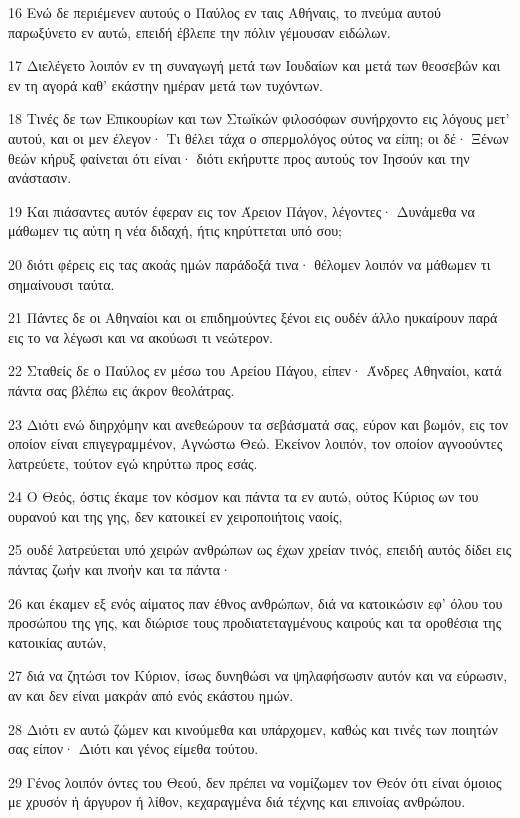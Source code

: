 \par 16 Ενώ δε περιέμενεν αυτούς ο Παύλος εν ταις Αθήναις, το πνεύμα αυτού παρωξύνετο εν αυτώ, επειδή έβλεπε την πόλιν γέμουσαν ειδώλων.
\par 17 Διελέγετο λοιπόν εν τη συναγωγή μετά των Ιουδαίων και μετά των θεοσεβών και εν τη αγορά καθ' εκάστην ημέραν μετά των τυχόντων.
\par 18 Τινές δε των Επικουρίων και των Στωϊκών φιλοσόφων συνήρχοντο εις λόγους μετ' αυτού, και οι μεν έλεγον· Τι θέλει τάχα ο σπερμολόγος ούτος να είπη; οι δέ· Ξένων θεών κήρυξ φαίνεται ότι είναι· διότι εκήρυττε προς αυτούς τον Ιησούν και την ανάστασιν.
\par 19 Και πιάσαντες αυτόν έφεραν εις τον Άρειον Πάγον, λέγοντες· Δυνάμεθα να μάθωμεν τις αύτη η νέα διδαχή, ήτις κηρύττεται υπό σου;
\par 20 διότι φέρεις εις τας ακοάς ημών παράδοξά τινα· θέλομεν λοιπόν να μάθωμεν τι σημαίνουσι ταύτα.
\par 21 Πάντες δε οι Αθηναίοι και οι επιδημούντες ξένοι εις ουδέν άλλο ηυκαίρουν παρά εις το να λέγωσι και να ακούωσι τι νεώτερον.
\par 22 Σταθείς δε ο Παύλος εν μέσω του Αρείου Πάγου, είπεν· Άνδρες Αθηναίοι, κατά πάντα σας βλέπω εις άκρον θεολάτρας.
\par 23 Διότι ενώ διηρχόμην και ανεθεώρουν τα σεβάσματά σας, εύρον και βωμόν, εις τον οποίον είναι επιγεγραμμένον, Αγνώστω Θεώ. Εκείνον λοιπόν, τον οποίον αγνοούντες λατρεύετε, τούτον εγώ κηρύττω προς εσάς.
\par 24 Ο Θεός, όστις έκαμε τον κόσμον και πάντα τα εν αυτώ, ούτος Κύριος ων του ουρανού και της γης, δεν κατοικεί εν χειροποιήτοις ναοίς,
\par 25 ουδέ λατρεύεται υπό χειρών ανθρώπων ως έχων χρείαν τινός, επειδή αυτός δίδει εις πάντας ζωήν και πνοήν και τα πάντα·
\par 26 και έκαμεν εξ ενός αίματος παν έθνος ανθρώπων, διά να κατοικώσιν εφ' όλου του προσώπου της γης, και διώρισε τους προδιατεταγμένους καιρούς και τα οροθέσια της κατοικίας αυτών,
\par 27 διά να ζητώσι τον Κύριον, ίσως δυνηθώσι να ψηλαφήσωσιν αυτόν και να εύρωσιν, αν και δεν είναι μακράν από ενός εκάστου ημών.
\par 28 Διότι εν αυτώ ζώμεν και κινούμεθα και υπάρχομεν, καθώς και τινές των ποιητών σας είπον· Διότι και γένος είμεθα τούτου.
\par 29 Γένος λοιπόν όντες του Θεού, δεν πρέπει να νομίζωμεν τον Θεόν ότι είναι όμοιος με χρυσόν ή άργυρον ή λίθον, κεχαραγμένα διά τέχνης και επινοίας ανθρώπου.
